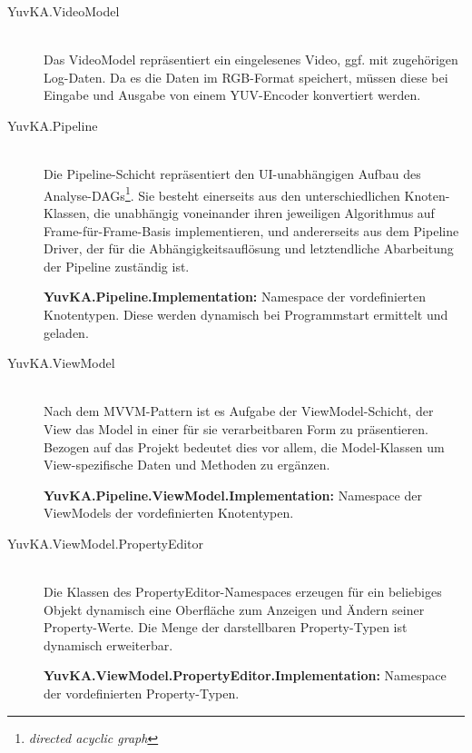 \begin{description}
	\item[YuvKA.VideoModel]~\\
	Das VideoModel repräsentiert ein eingelesenes Video, ggf. mit zugehörigen Log-Daten. Da es die Daten im RGB-Format speichert, müssen diese bei Eingabe und Ausgabe von einem YUV-Encoder konvertiert werden.

	\item[YuvKA.Pipeline]~\\
	Die Pipeline-Schicht repräsentiert den UI-unabhängigen Aufbau des Analyse-DAGs\footnote{\emph{directed acyclic graph}}. Sie besteht einerseits aus den unterschiedlichen Knoten-Klassen, die unabhängig voneinander ihren jeweiligen Algorithmus auf Frame-für-Frame-Basis implementieren, und andererseits aus dem Pipeline Driver, der für die Abhängigkeitsauflösung und letztendliche Abarbeitung der Pipeline zuständig ist.

	\textbf{YuvKA.Pipeline.Implementation:} Namespace der vordefinierten Knotentypen. Diese werden dynamisch bei Programmstart ermittelt und geladen.
	
	\item[YuvKA.ViewModel]~\\
	Nach dem MVVM-Pattern ist es Aufgabe der ViewModel-Schicht, der View das Model in einer für sie verarbeitbaren Form zu präsentieren. Bezogen auf das Projekt bedeutet dies vor allem, die Model-Klassen um View-spezifische Daten und Methoden zu ergänzen.

	\textbf{YuvKA.Pipeline.ViewModel.Implementation:} Namespace der ViewModels der vordefinierten Knotentypen.
	
	\item[YuvKA.ViewModel.PropertyEditor]~\\
	Die Klassen des PropertyEditor-Namespaces erzeugen für ein beliebiges Objekt dynamisch eine Oberfläche zum Anzeigen und Ändern seiner Property-Werte. Die Menge der darstellbaren Property-Typen ist dynamisch erweiterbar.

	\textbf{YuvKA.ViewModel.PropertyEditor.Implementation:} Namespace der vordefinierten Property-Typen.

\end{description}



